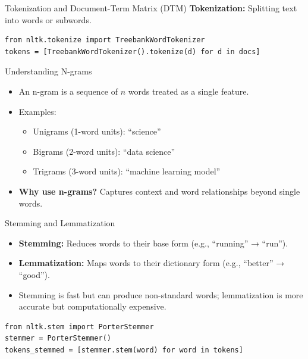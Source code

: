 \documentclass[handout]{beamer}
\begin{document}
\begin{frame}[fragile]{Tokenization and Document-Term Matrix (DTM)}
\textbf{Tokenization:} Splitting text into words or subwords.
\begin{verbatim}
from nltk.tokenize import TreebankWordTokenizer
tokens = [TreebankWordTokenizer().tokenize(d) for d in docs]
\end{verbatim}
\end{frame}

\begin{frame}[fragile]{Understanding N-grams}
	\begin{itemize}
		\item An n-gram is a sequence of \(n\) words treated as a single feature.
		\item Examples:
		\begin{itemize}
			\item Unigrams (1-word units): “science”
			\item Bigrams (2-word units): “data science”
			\item Trigrams (3-word units): “machine learning model”
		\end{itemize}
		\item \textbf{Why use n-grams?} Captures context and word relationships beyond single words.
	\end{itemize}
\end{frame}

\begin{frame}[fragile]{Stemming and Lemmatization}
	\begin{itemize}
		\item \textbf{Stemming:} Reduces words to their base form (e.g., “running” → “run”).
		\item \textbf{Lemmatization:} Maps words to their dictionary form (e.g., “better” → “good”).
		\item Stemming is fast but can produce non-standard words; lemmatization is more accurate but computationally expensive.
	\end{itemize}
\begin{verbatim}
from nltk.stem import PorterStemmer
stemmer = PorterStemmer()
tokens_stemmed = [stemmer.stem(word) for word in tokens]
\end{verbatim}
\end{frame}
\end{document}

